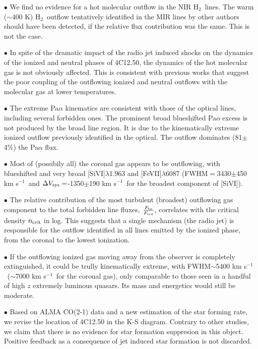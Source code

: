 \documentclass{aa}
\newcommand{\kms}{km s$^{-1}$~}
\newcommand{\pa}{Pa$\alpha~$}
\newcommand{\hmol}{H$_2$~}
\begin{document}
$\bullet$ We find no evidence for a hot molecular outflow in the NIR \hmol lines.   The warm ($\sim$400 K) \hmol outflow tentatively identified in the MIR lines by other authors should have been detected, if the relative flux contribution  was the same. This is not the case. 

$\bullet$ In spite of the dramatic impact of the radio jet induced shocks on the dynamics of the ionized and neutral phases of 4C12.50, the dynamics of the hot molecular gas   is not obviously affected. This is consistent with previous works that suggest the poor coupling of the outflowing ionized and neutral outflows with the molecular gas at lower temperatures.  



$\bullet$ The extreme   Pa$\alpha$ kinematics are consistent with those of the optical lines, including several forbidden ones. The prominent broad blueshifted  \pa excess   is not produced by the broad line region. It is due to the kinematically extreme ionized outflow previously identified in the optical.   The outflow dominates (81$\pm$4\%) the Pa$\alpha$ flux. 


$\bullet$  Most  of (possibily all) the  coronal gas appears to be outflowing, with blueshifted and very broad [SiVI]$\lambda$1.963 and [FeVII]$\lambda$6087  (FWHM$=$3430$\pm$450 \kms and   $\Delta V_{\rm sys}=$-1350$\pm$190 \kms for the broadest component of [SiVI]). 

$\bullet$ The relative contribution  of the most turbulent (broadest) outflowing gas component to the total forbidden line fluxes, $\frac{F_{\rm br}}{F_{\rm tot}}$, correlates with the critical density $n_{\rm crit}$ in log. This suggests that a single mechanism (the radio jet) is responsible for the outflow identified in all  lines emitted by the ionized phase, from the coronal to the lowest ionization. 


$\bullet$ If the outflowing ionized gas moving away from the observer is completely extinguished, it could be trully kinematically  extreme, with FWHM$\sim$5400 \kms ($\sim$7000 \kms for the coronal gas), only comparable to those seen in a handful of high $z$ extremely luminous quasars. Its mass and energetics would still be moderate.


$\bullet$ Based on ALMA CO(2-1) data and a new estimation of the star forming rate, we revise the location of 4C12.50 in the K-S diagram. Contrary to other studies, we claim that there is  no evidence for star formation suppresion in this object. Positive feedback as a consequence of jet induced star formation is not discarded.
\end{document}
